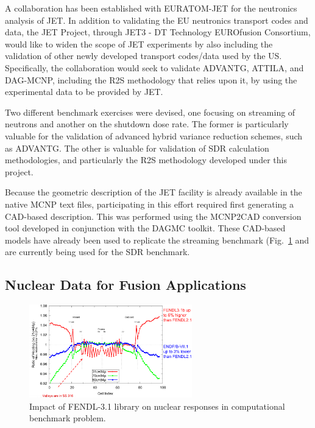 A collaboration has been established with EURATOM-JET for the neutronics
analysis of JET.  In addition to validating the EU neutronics transport codes
and data, the JET Project, through JET3 - DT Technology EUROfusion Consortium,
would like to widen the scope of JET experiments by also including the
validation of other newly developed transport codes/data used by the US.
Specifically, the collaboration would seek to validate ADVANTG, ATTILA, and
DAG-MCNP, including the \gls{R2S} methodology that relies upon it, by using
the experimental data to be provided by JET.

Two different benchmark exercises were devised, one focusing on streaming of
neutrons and another on the shutdown dose rate.  The former is particularly
valuable for the validation of advanced hybrid variance reduction schemes,
such as ADVANTG.  The other is valuable for validation of \gls{SDR}
calculation methodologies, and particularly the \gls{R2S} methodology
developed under this project.

Because the geometric description of the JET facility is already available in
the native MCNP text files, participating in this effort required first
generating a \gls{CAD}-based description.  This was performed using the
MCNP2CAD conversion tool developed in conjunction with the \gls{DAGMC}
toolkit.  These \gls{CAD}-based models have already been used to replicate the
streaming benchmark (Fig.\ \ref{fig:jet-streaming-benchmark} and are currently
being used for the \gls{SDR} benchmark.

\subsection{Nuclear Data for Fusion Applications}

\begin{figure}
\centering
\includegraphics[width=0.63\textwidth]{imgs/fendl3.png}
\caption{\label{fig:jet-streaming-benchmark}Impact of FENDL-3.1 library on
  nuclear responses in computational benchmark problem.}
\end{figure}

